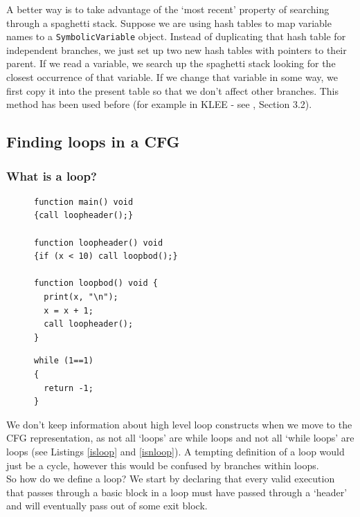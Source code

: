\documentclass[12pt,a4paper]{article}
\begin{document}
A better way is to take advantage of the `most recent' property of searching through a spaghetti stack. Suppose we are using hash tables to map variable names to a \texttt{SymbolicVariable} object. Instead of duplicating that hash table for independent branches, we just set up two new hash tables with pointers to their parent. If we read a variable, we search up the spaghetti stack looking for the closest occurrence of that variable. If we change that variable in some way, we first copy it into the present table so that we don't affect other branches. This method has been used before (for example in KLEE - see \citep{klee}, Section 3.2).

\subsection{Finding loops in a CFG} \label{app:loops}
\subsubsection{What is a loop?}
\begin{figure}\label{fig:loops}
\begin{minipage}{.45\textwidth}
\begin{lstlisting}[caption=A loop.,frame=tlrb, language=myLang, label={isloop},numbers=none]
function main() void 
{call loopheader();}

function loopheader() void
{if (x < 10) call loopbod();}

function loopbod() void {
  print(x, "\n");
  x = x + 1;
  call loopheader();
}
\end{lstlisting}
\end{minipage}\hfill
\begin{minipage}{.45\textwidth}
\begin{lstlisting}[caption=Not a loop.,frame=tlrb, language=myLang, label={isnloop}, numbers=none]
while (1==1)
{
  return -1;
}
\end{lstlisting}
\end{minipage}
\end{figure}

We don't keep information about high level loop constructs when we move to the CFG representation, as not all `loops' are while loops and not all `while loops' are loops (see Listings \ref{isloop} and \ref{isnloop}). A tempting definition of a loop would just be a cycle, however this would be confused by branches within loops.\\
So how do we define a loop? We start by declaring that every valid execution that passes through a basic block in a loop must have passed through 
a `header' and will eventually pass out of some exit block.\par
\end{document}

